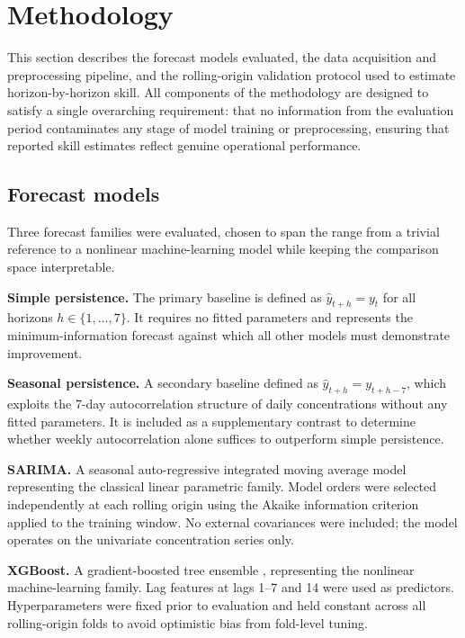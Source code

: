 \documentclass[12pt, a4paper]{article}
\begin{document}
\section{Methodology}
\label{sec:methodology}
This section describes the forecast models evaluated, the data
acquisition and preprocessing pipeline, and the rolling-origin
validation protocol used to estimate horizon-by-horizon skill.
All components of the methodology are designed to satisfy a
single overarching requirement: that no information from the
evaluation period contaminates any stage of model training or
preprocessing, ensuring that reported skill estimates reflect
genuine operational performance.

\subsection{Forecast models}
Three forecast families were evaluated, chosen to span the
range from a trivial reference to a nonlinear machine-learning
model while keeping the comparison space interpretable.

\textbf{Simple persistence.}
The primary baseline is defined as $\hat{y}_{t+h} = y_t$
for all horizons $h \in \{1,\dots,7\}$.
It requires no fitted parameters and represents the
minimum-information forecast against which all other
models must demonstrate improvement.

\textbf{Seasonal persistence.}
A secondary baseline defined as
$\hat{y}_{t+h} = y_{t+h-7}$, which exploits the 7-day
autocorrelation structure of daily  concentrations
without any fitted parameters.
It is included as a supplementary contrast to determine
whether weekly autocorrelation alone suffices to outperform
simple persistence.

\textbf{SARIMA.}
A seasonal auto-regressive integrated moving average model
\citep{BoxJenkins1970} representing the classical linear
parametric family.
Model orders were selected independently at each rolling
origin using the Akaike information criterion applied to
the training window.
No external covariances were included; the model operates
on the univariate concentration series only.

\textbf{XGBoost.}
A gradient-boosted tree ensemble \citep{Chen2016},
representing the nonlinear machine-learning family.
Lag features at lags 1--7 and 14 were used as predictors.
Hyperparameters were fixed prior to evaluation and held
constant across all rolling-origin folds to avoid
optimistic bias from fold-level tuning.
\end{document}
